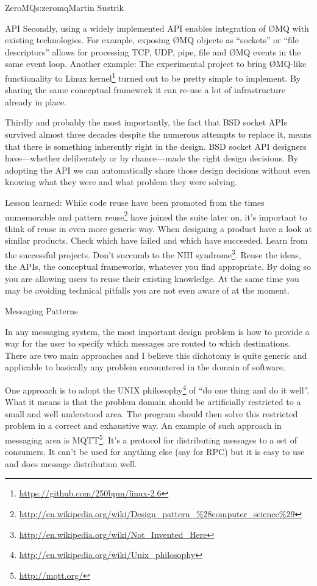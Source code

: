 \begin{aosachapter}{ZeroMQ}{s:zeromq}{Martin Sustrik}
\begin{aosasect1}{API}
Secondly, using a widely implemented API enables integration of {\O}MQ
with existing technologies. For example, exposing {\O}MQ objects as
``sockets'' or ``file descriptors'' allows for processing TCP, UDP,
pipe, file and {\O}MQ events in the same event loop. Another example: The
experimental project to bring {\O}MQ-like functionality to Linux
kernel\footnote{\url{https://github.com/250bpm/linux-2.6}} turned out
to be pretty simple to implement. By sharing the same conceptual
framework it can re-use a lot of infrastructure already in place.

Thirdly and probably the most importantly, the fact that BSD socket
APIs survived almost three decades despite the numerous attempts to
replace it, means that there is something inherently right in the
design. BSD socket API designers have---whether deliberately or by
chance---made the right design decisions. By adopting the API we can
automatically share those design decisions without even knowing what
they were and what problem they were solving.

Lesson learned: While code reuse have been promoted from the times
unmemorable and pattern
reuse\footnote{\url{http://en.wikipedia.org/wiki/Design_pattern_\%28computer_science\%29}}
have joined the suite later on, it's important to think of reuse in
even more generic way. When designing a product have a look at similar
products. Check which have failed and which have succeeded. Learn from
the successful projects. Don't succumb to the NIH
syndrome\footnote{\url{http://en.wikipedia.org/wiki/Not_Invented_Here}}. Reuse
the ideas, the APIs, the conceptual frameworks, whatever you find
appropriate. By doing so you are allowing users to reuse their
existing knowledge. At the same time you may be avoiding technical
pitfalls you are not even aware of at the moment.

\end{aosasect1}

\begin{aosasect1}{Messaging Patterns}

In any messaging system, the most important design problem is how to
provide a way for the user to specify which messages are routed to
which destinations.  There are two main approaches and I believe this
dichotomy is quite generic and applicable to basically any problem
encountered in the domain of software.

One approach is to adopt the UNIX
philosophy\footnote{\url{http://en.wikipedia.org/wiki/Unix_philosophy}}
of ``do one thing and do it well''. What it means is that the problem
domain should be artificially restricted to a small and well
understood area. The program should then solve this restricted problem
in a correct and exhaustive way. An example of such approach in
messaging area is MQTT\footnote{\url{http://mqtt.org/}}. It's a
protocol for distributing messages to a set of consumers. It can't be
used for anything else (say for RPC) but it is easy to use and does
message distribution well.


\end{aosasect1}
\end{aosachapter}
